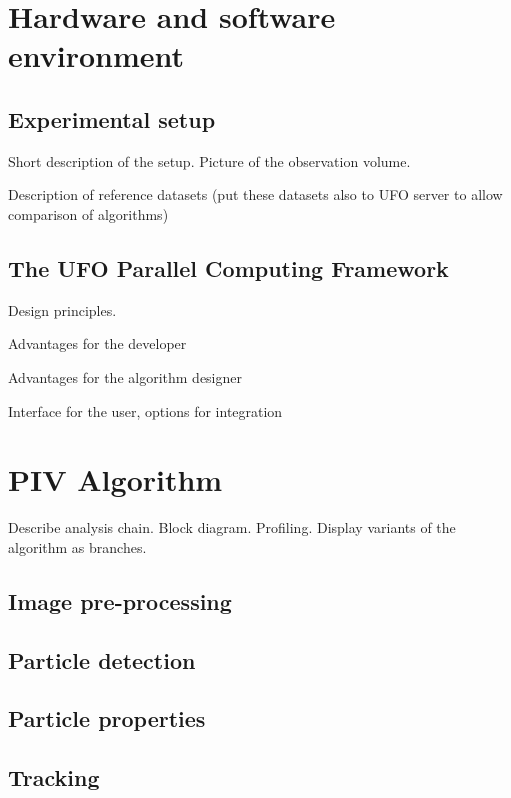 \documentclass[11pt,draft]{amsart}
\begin{document}
\section{Hardware and software environment}

\subsection{Experimental setup}

Short description of the setup. Picture of the observation volume. 

Description of reference datasets (put these datasets also to UFO server to allow comparison of algorithms)


\subsection{The UFO Parallel Computing Framework}

Design principles.

Advantages for the developer

Advantages for the algorithm designer

Interface for the user, options for integration


\section{PIV Algorithm}

Describe analysis chain. Block diagram. Profiling.
Display variants of the algorithm as branches.


\subsection{Image pre-processing}

\subsection{Particle detection}

\subsection{Particle properties}

\subsection{Tracking}
\end{document}
